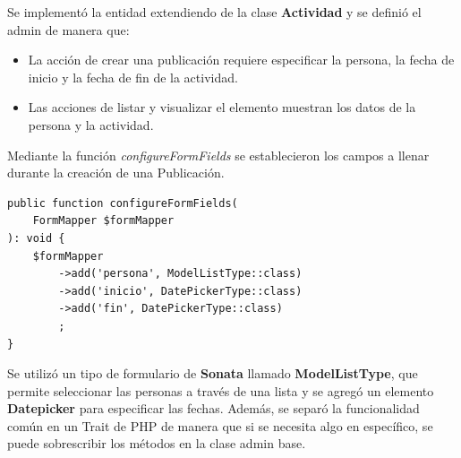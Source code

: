 \begin{itemize}
        
\end{itemize}


Se implementó la entidad extendiendo de la clase \textbf{Actividad} y se definió el admin de manera que:

\begin{itemize}
    \item La acción de crear una publicación requiere especificar la persona, la fecha de inicio y la fecha de fin de la actividad.
    \item Las acciones de listar y visualizar el elemento muestran los datos de la persona y la actividad.
\end{itemize}

Mediante la función \textit{configureFormFields} se establecieron los campos a llenar durante la creación de una Publicación.

\begin{lstlisting}[caption={Definición de campos durante la creación de Publicaciones.\\Fuente: Elaboración propia}]
public function configureFormFields(
    FormMapper $formMapper
): void {
    $formMapper
        ->add('persona', ModelListType::class)
        ->add('inicio', DatePickerType::class)
        ->add('fin', DatePickerType::class)
        ;
}
\end{lstlisting}

Se utilizó un tipo de formulario de \textbf{Sonata} llamado \textbf{ModelListType}, que permite seleccionar las personas a través de una lista y se agregó
un elemento \textbf{Datepicker} para especificar
las fechas\@. Además, se separó la funcionalidad común en un Trait de PHP de manera que si se necesita algo en específico, se puede sobrescribir los métodos
en la clase admin base.
